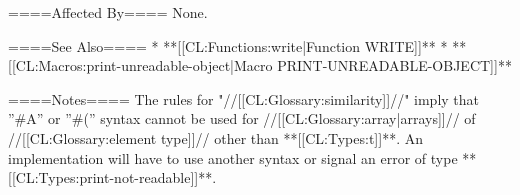 ====Affected By====
None.

====See Also====
  * **[[CL:Functions:write|Function WRITE]]**
  * **[[CL:Macros:print-unreadable-object|Macro PRINT-UNREADABLE-OBJECT]]**

====Notes====
The rules for "//[[CL:Glossary:similarity]]//" imply that ''#A'' or ''#('' syntax cannot be used for //[[CL:Glossary:array|arrays]]// of //[[CL:Glossary:element type]]// other than **[[CL:Types:t]]**. An implementation will have to use another syntax or signal an error of type **[[CL:Types:print-not-readable]]**.

  
